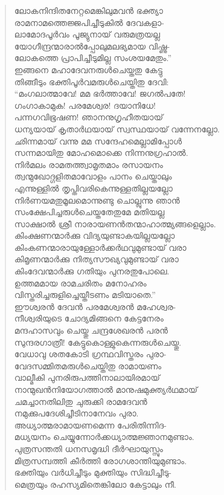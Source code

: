 \begin{verse}
ലോകനിന്ദിതനേറ്റമെങ്കിലുമവന്‍ ഭക്ത്യാ\\
രാമനാമത്തെജ്ജപിച്ചീടുകില്‍ ദേവകളാ-\\
ലാമോദപൂര്‍വം പൂജ്യുനായ് വരുമത്രയല്ല\\
യോഗീന്ദ്രന്മാരാല്‍പ്പോലുമലഭ്യമായ വിഷ്ണു-\\
ലോകത്തെ പ്രാപിച്ചീടുമില്ല സംശയമേതും.”\\
ഇങ്ങനെ മഹാദേവനരുള്‍ചെയ്തതു കേട്ടു\\
തിങ്ങീടും ഭക്തിപൂര്‍വമരുള്‍ചെയ്തിതു ദേവി:\\
“മംഗലാത്മാവേ! മമ ഭര്‍ത്താവേ! ജഗല്‍പതേ!\\
ഗംഗാകാമുക! പരമേശ്വര! ദയാനിധേ!\\
പന്നഗവിഭൂഷണ! ഞാനനുഗൃഹീതയായ്\\
ധന്യയായ് കൃതാര്‍ഥയായ് സ്വസ്ഥയായ് \hbox{വന്നേനല്ലോ.}\\
ഛിന്നമായ് വന്നു മമ സന്ദേഹമെല്ലാമിപ്പോള്‍\\
സന്നമായിതു മോഹമൊക്കെ നിന്നനുഗ്രഹാല്‍.\\
നിര്‍മലം രാമതത്ത്വാമൃതമാം രസായനം\\
ത്വന്മുഖോദ്ഗളിതമാവോളം പാനം ചെയ്താലും\\
എന്നുള്ളില്‍ തൃപ്തിവരികെന്നുള്ളതില്ലയല്ലോ\\
നിര്‍ണയമതുമൂലമൊന്നുണ്ടു ചൊല്ലുന്നു ഞാന്‍\\
സംക്ഷേപിച്ചരുള്‍ചെയ്തതേതുമേ മതിയല്ല\\
സാക്ഷാല്‍ ശ്രീ നാരായണന്‍തന്മാഹാത്മ്യങ്ങളെല്ലാം.\\
കിംക്ഷണന്മാര്‍ക്കു വിദ്യയുണ്ടാകയില്ലയല്ലോ\\
കിംകണന്മാരായുള്ളോര്‍ക്കര്‍ഥവുമുണ്ടായ് വരാ\\
കിമൃണന്മാര്‍ക്കു നിത്യസൗഖ്യവുമുണ്ടായ് വരാ\\
കിംദേവന്മാര്‍ക്കു ഗതിയും പുനരതുപോലെ.\\
ഉത്തമമായ രാമചരിതം മനോഹരം\\
വിസ്തരിച്ചരുളിച്ചെയ്തീടണം മടിയാതെ.”\\
ഈശ്വരന്‍ ദേവന്‍ പരമേശ്വരന്‍ മഹേശ്വര-\\
നീശ്വരിയുടെ ചോദ്യമിങ്ങനെ കേട്ടനേരം\\
മന്ദഹാസവും ചെയ്തു ചന്ദ്രശേഖരന്‍ പരന്‍\\
സുന്ദരഗാത്രീ! കേട്ടുകൊള്ളുകെന്നരുള്‍ചെയ്തു.\\
വേധാവു ശതകോടി ഗ്രന്ഥവിസ്തരം പുരാ-\\
വേദസമ്മിതമരുള്‍ചെയ്തിതു രാമായണം\\
വാല്മീകി പുനരിരുപത്തിനാലായിരമായ്\\
നാന്മുഖന്‍നിയോഗത്താല്‍ മാനുഷമുക്ത്യര്‍ഥമായ്\\
ചമച്ചാനതിലിതു ചുരുക്കി രാമദേവന്‍\\
നമുക്കുപദേശിച്ചീടിനാനേവം പുരാ.\\
അധ്യാത്മരാമായണമെന്ന പേരിതിന്നിദ-\\
മധ്യയനം ചെയ്യുന്നോര്‍ക്കധ്യാത്മജ്ഞാനമുണ്ടാം.\\
പുത്രസന്തതി ധനസമൃദ്ധി ദീര്‍ഘായുസ്സും\\
മിത്രസമ്പത്തി കീര്‍ത്തി രോഗശാന്തിയുമുണ്ടാം.\\
ഭക്തിയും വര്‍ധിച്ചീടും മുക്തിയും സിദ്ധിച്ചീടു-\\
മെത്രയും രഹസ്യമിതെങ്കിലോ കേട്ടാലും നീ.
\end{verse}

